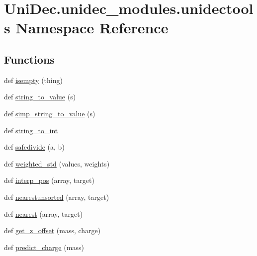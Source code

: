 \hypertarget{namespace_uni_dec_1_1unidec__modules_1_1unidectools}{}\section{Uni\+Dec.\+unidec\+\_\+modules.\+unidectools Namespace Reference}
\label{namespace_uni_dec_1_1unidec__modules_1_1unidectools}
\subsection*{Functions}
\begin{DoxyCompactItemize}
\item 
def \hyperlink{namespace_uni_dec_1_1unidec__modules_1_1unidectools_a838291c691ffe94a4cb1148406386619}{isempty} (thing)
\item 
def \hyperlink{namespace_uni_dec_1_1unidec__modules_1_1unidectools_a8adad847df5befb182ec323902290087}{string\+\_\+to\+\_\+value} (s)
\item 
def \hyperlink{namespace_uni_dec_1_1unidec__modules_1_1unidectools_ab48820a082315bf10e679c5e2c3be0f7}{simp\+\_\+string\+\_\+to\+\_\+value} (s)
\item 
def \hyperlink{namespace_uni_dec_1_1unidec__modules_1_1unidectools_abb001653fd15f708d572f898926d23ac}{string\+\_\+to\+\_\+int}
\item 
def \hyperlink{namespace_uni_dec_1_1unidec__modules_1_1unidectools_a0687bfbe2b5283a88175b03b4dc03dd7}{safedivide} (a, b)
\item 
def \hyperlink{namespace_uni_dec_1_1unidec__modules_1_1unidectools_a62d89448acdebf10747cd8a8007e9efb}{weighted\+\_\+std} (values, weights)
\item 
def \hyperlink{namespace_uni_dec_1_1unidec__modules_1_1unidectools_a97c1748e2cdc7eadb3a16817546404a8}{interp\+\_\+pos} (array, target)
\item 
def \hyperlink{namespace_uni_dec_1_1unidec__modules_1_1unidectools_ac30fff96486cdac619a26c8b767c2dc2}{nearestunsorted} (array, target)
\item 
def \hyperlink{namespace_uni_dec_1_1unidec__modules_1_1unidectools_accfc6ed23958d9243e13a9dc686ec1e6}{nearest} (array, target)
\item 
def \hyperlink{namespace_uni_dec_1_1unidec__modules_1_1unidectools_a2225b627c44d4817bdd1bde2320392a6}{get\+\_\+z\+\_\+offset} (mass, charge)
\item 
def \hyperlink{namespace_uni_dec_1_1unidec__modules_1_1unidectools_a37d9d71960dded5cc70fa207a5c61459}{predict\+\_\+charge} (mass)

\end{DoxyCompactItemize}
